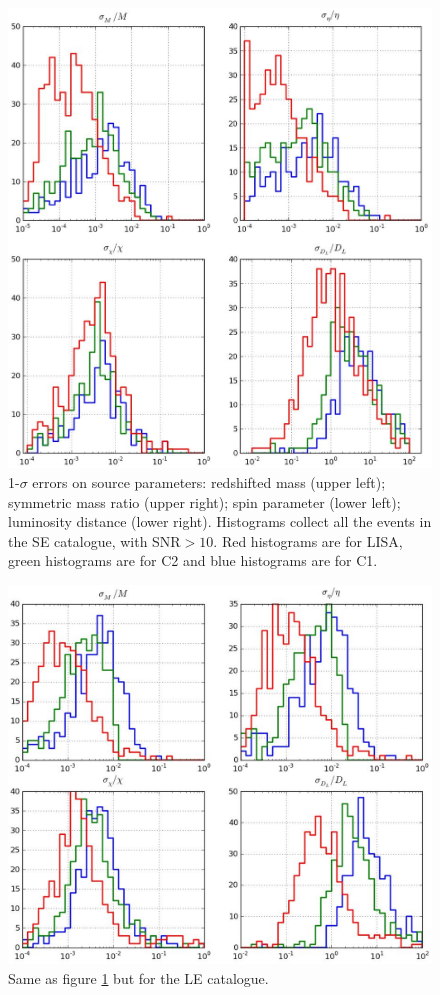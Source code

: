 \documentclass{iopart}
\begin{document}
\begin{figure}[H]
\center
   \includegraphics[width=1\textwidth]{FigSMBHPhenomAEI/Hist_SE_LISAC1C2.eps}
\caption{1-$\sigma$ errors on source parameters: redshifted mass (upper left); symmetric mass ratio (upper right); spin parameter (lower left); luminosity distance (lower right). Histograms collect all the events in the SE catalogue, with SNR$>10$. Red histograms are for LISA, green histograms are for C2 and blue histograms are for C1.
\label{Hist_SE_LISAC1C2} } 
\end{figure}



\begin{figure}[H]
\center
   \includegraphics[width=1\textwidth]{FigSMBHPhenomAEI/Hist_LE_LISAC1C2.eps}
\caption{Same as figure \ref{Hist_SE_LISAC1C2} but for the LE catalogue.
\label{Hist_LE_LISAC1C2} } 
\end{figure}
\end{document}
